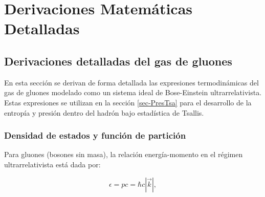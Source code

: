 \chapter{Derivaciones Matemáticas Detalladas}\label{app:math_derivations}

\pagestyle{fancy}
\fancyhf{} %
\fancyhead[RE]{\nouppercase{\hfill \textbf{\leftmark}}} %
\fancyhead[LO]{\nouppercase{\textbf{\leftmark} \hfill}} %


\section{Derivaciones detalladas del gas de gluones}
\label{app:BE_derivation}

En esta sección se derivan de forma detallada las expresiones termodinámicas del gas de gluones modelado como un sistema ideal de Bose-Einstein ultrarrelativista. Estas expresiones se utilizan en la sección \ref{sec-PresTsa} para el desarrollo de la entropía y presión dentro del hadrón bajo estadística de Tsallis.


\subsection{Densidad de estados y función de partición}

Para gluones (bosones sin masa), la relación energía-momento en el régimen ultrarrelativista está dada por:

\begin{equation}
\epsilon = p c = \hbar c |\vec{k}|,
\end{equation}

